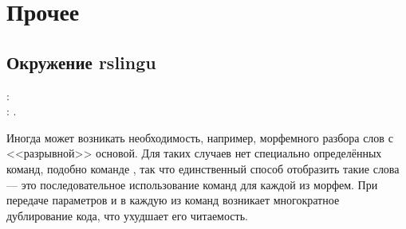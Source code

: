 \section{Прочее}

\subsection{Окружение rslingu}

\begin{tcolorbox}
    \noindent\rsTypeAux[env]: \\
    \hspace*{1cm} \rsOptionsAux: .
\end{tcolorbox}

Иногда может возникать необходимость, например, морфемного разбора слов с <<разрывной>> основой. Для таких случаев нет специально
определённых команд, подобно команде , так что единственный способ отобразить такие слова --- это
последовательное использование команд для каждой из морфем. При передаче параметров  и  в каждую из
команд возникает многократное дублирование кода, что ухудшает его читаемость.



